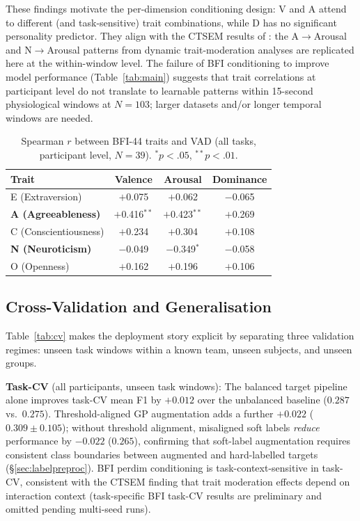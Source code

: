 \documentclass[sigconf,review,anonymous]{acmart}
\begin{document}
These findings motivate the per-dimension conditioning design: V and A
attend to different (and task-sensitive) trait combinations, while
D has no significant personality predictor.
They align with the CTSEM results of \citeauthor{meng2026moderating}:
the A$\to$Arousal and N$\to$Arousal patterns from dynamic trait-moderation
analyses are replicated here at the within-window level.
The failure of BFI conditioning to improve model performance
(Table~\ref{tab:main}) suggests that trait correlations at participant level
do not translate to learnable patterns within 15-second physiological windows
at $N = 103$; larger datasets and/or longer temporal windows are needed.

\begin{table}[t]
\caption{Spearman $r$ between BFI-44 traits and VAD (all tasks,
  participant level, $N=39$). $^*p < .05$, $^{**}p < .01$.}
\label{tab:bfi_corr}
\centering
\setlength{\tabcolsep}{5pt}
\begin{tabular}{lccc}
\toprule
\textbf{Trait} & \textbf{Valence} & \textbf{Arousal} & \textbf{Dominance} \\
\midrule
E (Extraversion)     & $+$0.075     & $+$0.062       & $-$0.065 \\
\textbf{A (Agreeableness)} & $+$0.416$^{**}$ & $+$0.423$^{**}$ & $+$0.269 \\
C (Conscientiousness)& $+$0.234     & $+$0.304       & $+$0.108 \\
\textbf{N (Neuroticism)}   & $-$0.049     & $-$0.349$^{*}$ & $-$0.058 \\
O (Openness)         & $+$0.162     & $+$0.196       & $+$0.106 \\
\bottomrule
\end{tabular}
\end{table}

\subsection{Cross-Validation and Generalisation}
\label{sec:cv}

Table~\ref{tab:cv} makes the deployment story explicit by separating three
validation regimes: unseen task windows within a known team, unseen subjects,
and unseen groups.

\textbf{Task-CV} (all participants, unseen task windows):
The balanced target pipeline alone improves task-CV mean F1
by $+0.012$ over the unbalanced baseline ($0.287$ vs.\ $0.275$).
Threshold-aligned GP augmentation adds a further $+0.022$
($0.309 \pm 0.105$); without threshold alignment, misaligned soft labels
\emph{reduce} performance by $-0.022$ ($0.265$), confirming that soft-label
augmentation requires consistent class boundaries between augmented and
hard-labelled targets (§\ref{sec:labelpreproc}).
BFI perdim conditioning is task-context-sensitive in task-CV,
consistent with the CTSEM finding that trait moderation effects depend
on interaction context (task-specific BFI task-CV results are preliminary
and omitted pending multi-seed runs).
\end{document}
